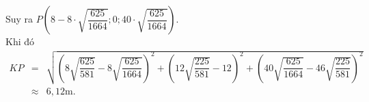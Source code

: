 \begin{ex}
{\begin{itemchoice}
			Suy ra $P\left(8- 8\cdot\sqrt{\dfrac{625}{1664}};0;40\cdot\sqrt{\dfrac{625}{1664}}\right)$.\\
			Khi đó 
			\allowdisplaybreaks
			\begin{eqnarray*}
				KP&=&\sqrt{\left(8\sqrt{\dfrac{625}{581}}-8\sqrt{\dfrac{625}{1664}}\right)^2+\left(12\sqrt{\dfrac{225}{581}}-12\right)^2+\left(40\sqrt{\dfrac{625}{1664}}-46\sqrt{\dfrac{225}{581}}\right)^2}
				\\
				&\approx& 6{,}12 \text{m}.
			\end{eqnarray*}
		\end{itemchoice}
	}
\end{ex}
